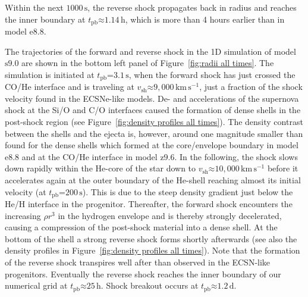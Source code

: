 \documentclass[fleqn,usenatbib]{mnras}
\newcommand{\tpb}{\ensuremath{t_{\text{pb}}}}
\newcommand{\kms}{\ensuremath{\mathrm{km\, s^{-1}}}}
\newcommand{\s}{\ensuremath{\text{s}}}
\newcommand{\onemg}{\ensuremath{\mathrm{e8.8}}\xspace}
\newcommand{\snine}{\ensuremath{\mathrm{s9.0}}\xspace}
\newcommand{\znine}{\ensuremath{\mathrm{z9.6}}\xspace}
\begin{document}
Within the next $1000\,\s$, the reverse shock propagates back in radius and reaches the inner boundary
at $\tpb \mathord{\approx} 1.14\,\text{h}$, which is more than 4 hours earlier than in model \onemg. 

The trajectories of the forward and reverse shock in the 1D simulation of model \snine 
are shown in the bottom left panel of Figure~\ref{fig:radii all times}. 
The simulation is initiated at $\tpb\mathord{=}3.1\,\s$, when the forward shock has just crossed the CO/He interface
and is traveling at $v_{\mathrm{sh}}\mathord{\approx} 9,000\,\kms$, just a fraction of the shock
velocity found in the ECSNe-like models. De- and accelerations of the supernova shock at the Si/O and 
C/O interfaces caused the formation of dense shells in the 
post-shock region (see Figure~\ref{fig:density profiles all times}).
The density contrast between the shells and the ejecta is,
however, around one magnitude smaller than found for the dense shells which formed at the core/envelope
boundary in model \onemg and at the CO/He interface in model \znine. 
In the following, the shock slows down rapidly within the He-core of the star down to 
$v_{\mathrm{sh}}\mathord{\approx}10,000\,\kms$ before it accelerates again at the outer
boundary of the He-shell reaching almost its initial velocity (at $\tpb\mathord{=}200\,\s$).
This is due to 
the steep density gradient just below the He/H interface in the progenitor. 
Thereafter, the forward shock encounters the increasing $\rho r^3$ in the hydrogen envelope and is 
thereby strongly decelerated, causing a compression of the post-shock material into a dense shell. 
At the bottom of the shell a strong reverse shock forms shortly afterwards (see also the density profiles 
in Figure~\ref{fig:density profiles all times}). Note that the formation of the reverse shock transpires 
well after than observed in the ECSN-like progenitors. 
Eventually the reverse shock reaches the inner boundary of our numerical grid at 
$\tpb\mathord{\approx}25\,\mathrm{h}$. Shock breakout occurs at $\tpb\mathord{\approx}1.2\,\mathrm{d}$.
\end{document}
